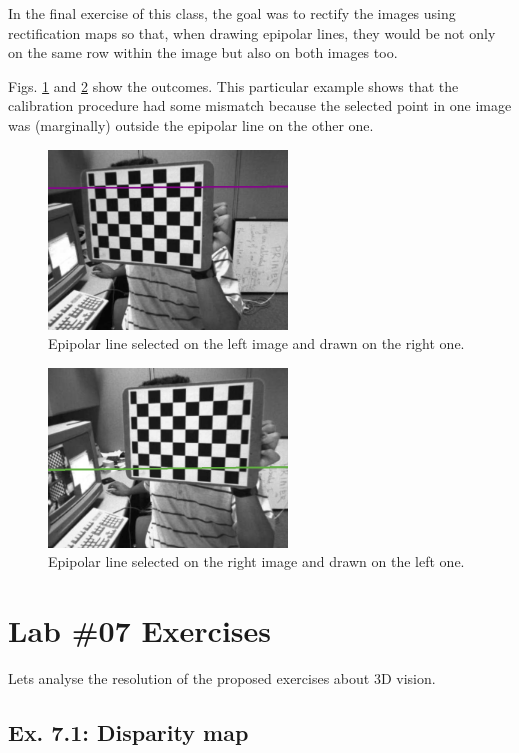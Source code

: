 \documentclass[journal]{IEEEtran}
\begin{document}
In the final exercise of this class, the goal was to rectify the images using rectification maps so that, when drawing epipolar lines, they would be not only on the same row within the image but also on both images too.

Figs. \ref{fig:6.5_right_epipolar} and \ref{fig:6.5_left_epipolar} show the outcomes. This particular example shows that the calibration procedure had some mismatch because the selected point in one image was (marginally) outside the epipolar line on the other one.

\begin{figure}[htp]
  \centering
  \includegraphics[width=2.5in]{imgs/6.5_right_epipolar.png}
  \caption{Epipolar line selected on the left image and drawn on the right one.}
  \label{fig:6.5_right_epipolar}
\end{figure}
\FloatBarrier

\begin{figure}[htp]
  \centering
  \includegraphics[width=2.5in]{imgs/6.5_left_epipolar.png}
  \caption{Epipolar line selected on the right image and drawn on the left one.}
  \label{fig:6.5_left_epipolar}
\end{figure}
\FloatBarrier

\section{Lab \#07 Exercises}

Lets analyse the resolution of the proposed exercises about 3D vision.

\subsection{Ex. 7.1: Disparity map}
\end{document}
